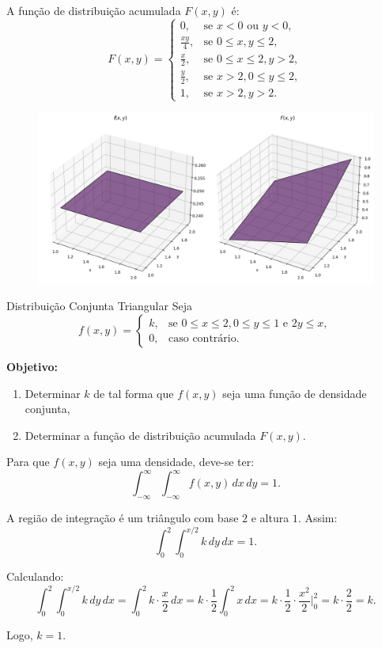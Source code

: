 \begin{frame}
A função de distribuição acumulada \(F(x, y)\) é:
\[
F(x, y) =
\begin{cases}
	0, & \text{se } x < 0 \text{ ou } y < 0, \\
	\frac{xy}{4}, & \text{se } 0 \leq x, y \leq 2, \\
	\frac{x}{2}, & \text{se } 0 \leq x \leq 2, y > 2, \\
	\frac{y}{2}, & \text{se } x > 2, 0 \leq y \leq 2, \\
	1, & \text{se } x > 2, y > 2.
\end{cases}
\]

	\begin{figure}[!htb]
	\begin{center}
		\includegraphics[scale=0.3]{ExemF.png}
	\end{center}
\end{figure} 


\end{frame}



\begin{frame}{Distribuição Conjunta Triangular}
Seja 
	\[
	f(x, y) =
	\begin{cases}
		k, & \text{se } 0 \leq x \leq 2, 0 \leq y \leq 1 \text{ e } 2y \leq x, \\
		0, & \text{caso contrário}.
	\end{cases}
	\] 
	
	\textbf{Objetivo:}
	\begin{enumerate}
		\item Determinar \(k\) de tal forma que $f(x,y)$ seja uma função de densidade conjunta,
		\item Determinar a função de distribuição acumulada \(F(x, y)\).
	\end{enumerate}

	Para que \(f(x, y)\) seja uma densidade, deve-se ter:
	\[
	\int_{-\infty}^\infty \int_{-\infty}^\infty f(x, y) \, dx \, dy = 1.
	\]
	
	A região de integração é um triângulo com base \(2\) e altura \(1\). Assim:
	\[
	\int_{0}^2 \int_{0}^{x/2} k \, dy \, dx = 1.
	\]
	
	Calculando:
	\[
	\int_{0}^2 \int_{0}^{x/2} k \, dy \, dx = \int_{0}^2 k \cdot \frac{x}{2} \, dx = k \cdot \frac{1}{2} \int_{0}^2 x \, dx = k \cdot \frac{1}{2} \cdot \frac{x^2}{2} \Big|_0^2 = k \cdot \frac{2}{2} = k.
	\]
	
	Logo, \(k = 1\).
\end{frame}


